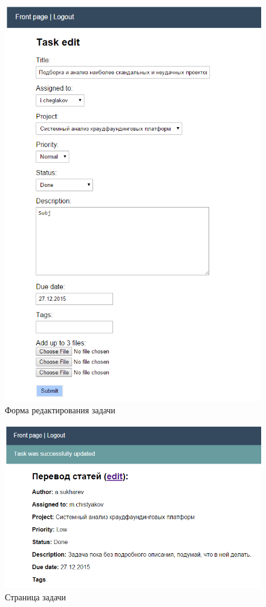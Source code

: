 \documentclass[14pt, a4paper]{extreport}
\begin{document}
\begin{figure}[!htb]
  \centering
    \includegraphics[scale=0.6]{../shared_images/frontend/task-edit.png}
   \caption{Форма редактирования задачи}
    \label{fig:start}
\end{figure}

\begin{figure}[!htb]
  \centering
    \includegraphics[scale=0.6]{../shared_images/frontend/task-view.png}
   \caption{Страница задачи}
    \label{fig:start}
\end{figure}
\end{document}
